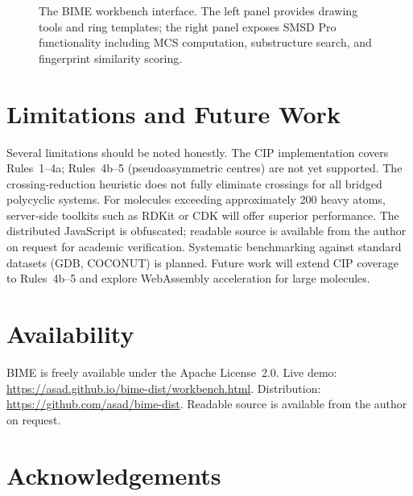 \documentclass[twocolumn]{article}
\begin{document}
\begin{figure}[t]
\centering
{}
\caption{The BIME workbench interface.  The left panel provides
  drawing tools and ring templates; the right panel exposes SMSD Pro
  functionality including MCS computation, substructure search, and
  fingerprint similarity scoring.}
\label{fig:workbench}
\end{figure}

\section{Limitations and Future Work}

Several limitations should be noted honestly.  The CIP implementation
covers Rules~1--4a; Rules~4b--5 (pseudoasymmetric centres) are not
yet supported.  The crossing-reduction heuristic does not fully
eliminate crossings for all bridged polycyclic systems.  For molecules
exceeding approximately 200 heavy atoms, server-side toolkits such as
RDKit or CDK will offer superior performance.  The distributed
JavaScript is obfuscated; readable source is available from the author
on request for academic verification.  Systematic benchmarking against
standard datasets (GDB, COCONUT) is planned.  Future work will extend
CIP coverage to Rules~4b--5 and explore WebAssembly acceleration for
large molecules.

\section*{Availability}

BIME is freely available under the Apache License~2.0.
Live demo: \url{https://asad.github.io/bime-dist/workbench.html}.
Distribution: \url{https://github.com/asad/bime-dist}.
Readable source is available from the author on request.

\section*{Acknowledgements}
\end{document}
